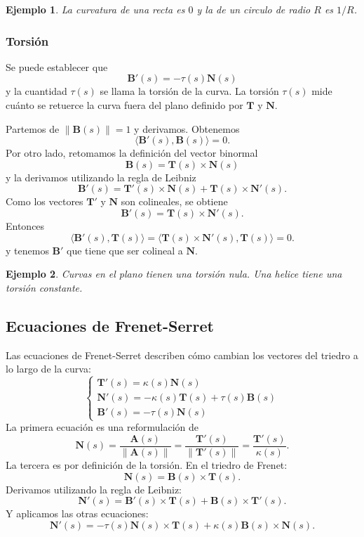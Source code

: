 \documentclass[11pt]{book}
\theoremstyle{definicion}
\theoremstyle{teorema}
\theoremstyle{ejemplo}
\newtheorem{example}{Ejemplo}
\begin{document}
\begin{example}
    La curvatura de una recta es $0$ y la de un circulo de radio $R$ es $1/R$.
\end{example}

\subsubsection{Torsi\'on}

\noindent 
Se puede establecer que
\[
\mathbf{B}'(s) = -\tau(s) \mathbf{N}(s)
\]
y la cuantidad $\tau(s)$ se llama la torsi\'on de la curva.
La torsión \(\tau (s)\) mide cuánto se retuerce la curva fuera del plano definido por \(\mathbf{T}\) y \(\mathbf{N}\).

\noindent Partemos de $\| \mathbf{B}(s) \|=1$ y derivamos. Obtenemos
\[
\langle \mathbf{B}'(s) , \mathbf{B}(s) \rangle = 0.
\]
Por otro lado, retomamos la definici\'on del vector binormal
\[ \mathbf{B}(s) = \mathbf{T}(s) \times \mathbf{N}(s) \]
y la derivamos utilizando la regla de Leibniz
\[ \mathbf{B}'(s) = \mathbf{T}'(s) \times \mathbf{N}(s)
+
\mathbf{T}(s) \times \mathbf{N}'(s).
\]
Como los vectores $\mathbf{T}'$ y $\mathbf{N}$ son colineales,
se obtiene
\[ \mathbf{B}'(s) = 
\mathbf{T}(s) \times \mathbf{N}'(s).
\]
Entonces
\[
\langle \mathbf{B}'(s) , \mathbf{T}(s) \rangle =
\langle \mathbf{T}(s) \times \mathbf{N}'(s) , \mathbf{T}(s) \rangle
= 0.
\]
y tenemos $\mathbf{B}'$ que tiene que ser colineal a $\mathbf{N}$.
\begin{example}
Curvas en el plano tienen una torsi\'on nula. Una helice tiene una torsi\'on constante. 
\end{example}

\subsection{Ecuaciones de Frenet-Serret}
\noindent Las ecuaciones de Frenet-Serret describen cómo cambian los vectores del triedro a lo largo de la curva:
\[
\begin{cases}
\mathbf{T}'(s) = \kappa(s) \mathbf{N}(s) \\
\mathbf{N}'(s) = -\kappa(s) \mathbf{T}(s) + \tau(s) \mathbf{B}(s) \\
\mathbf{B}'(s) = -\tau(s) \mathbf{N}(s)
\end{cases}
\]
La primera ecuaci\'on es una reformulaci\'on de
\[
\mathbf{N}(s) = \frac{\mathbf{A}(s)}{\| \mathbf{A}(s) \|}  = \frac{\mathbf{T}'(s)}{\| \mathbf{T}'(s) \|} =
\frac{\mathbf{T}'(s)}{\kappa(s)}.
\]
La tercera es por definici\'on de la torsi\'on.
En el triedro de Frenet:
\[
\mathbf{N}(s) = \mathbf{B}(s) \times \mathbf{T}(s).
\]
Derivamos utilizando la regla de Leibniz:
\[
\mathbf{N}'(s) = \mathbf{B}'(s) \times \mathbf{T}(s)
+ \mathbf{B}(s) \times \mathbf{T}'(s).
\]
Y aplicamos las otras ecuaciones:
\[
\mathbf{N}'(s) = -\tau(s) \mathbf{N}(s) \times \mathbf{T}(s)
+ \kappa(s) \mathbf{B}(s) \times \mathbf{N}(s).
\]
\end{document}

